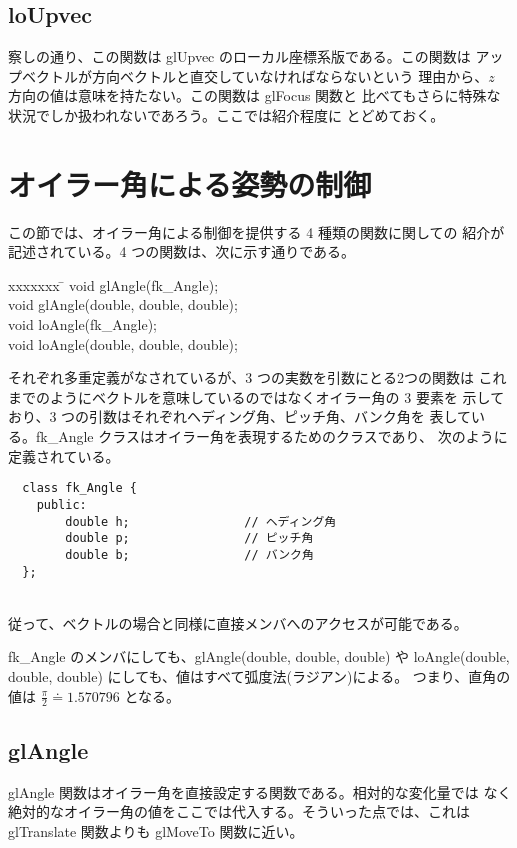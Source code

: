 \subsection{loUpvec}
察しの通り、この関数は glUpvec のローカル座標系版である。この関数は
アップベクトルが方向ベクトルと直交していなければならないという
理由から、\(z\) 方向の値は意味を持たない。この関数は glFocus 関数と
比べてもさらに特殊な状況でしか扱われないであろう。ここでは紹介程度に
とどめておく。
\section{オイラー角による姿勢の制御}
この節では、オイラー角による制御を提供する 4 種類の関数に関しての
紹介が記述されている。4 つの関数は、次に示す通りである。
\begin{bf}
\begin{tabbing}
xxxxxxx \= \kill
\> void glAngle(fk\_Angle); \\
\> void glAngle(double, double, double); \\
\> void loAngle(fk\_Angle); \\
\> void loAngle(double, double, double); \\
\end{tabbing}
\end{bf}
それぞれ多重定義がなされているが、3 つの実数を引数にとる2つの関数は
これまでのようにベクトルを意味しているのではなくオイラー角の 3 要素を
示しており、3 つの引数はそれぞれヘディング角、ピッチ角、バンク角を
表している。fk\_Angle クラスはオイラー角を表現するためのクラスであり、
次のように定義されている。
\\
\begin{screen}
\begin{verbatim}
  class fk_Angle {
    public:
        double h;                // ヘディング角
        double p;                // ピッチ角
        double b;                // バンク角
  };
\end{verbatim}
\end{screen}
~ \\
従って、ベクトルの場合と同様に直接メンバへのアクセスが可能である。

fk\_Angle のメンバにしても、glAngle(double, double, double) や
loAngle(double, double, double) にしても、値はすべて弧度法(ラジアン)による。
つまり、直角の値は \(\frac{\pi}{2} \doteq 1.570796\) となる。
\subsection{glAngle}
glAngle 関数はオイラー角を直接設定する関数である。相対的な変化量では
なく絶対的なオイラー角の値をここでは代入する。そういった点では、これは
glTranslate 関数よりも glMoveTo 関数に近い。

